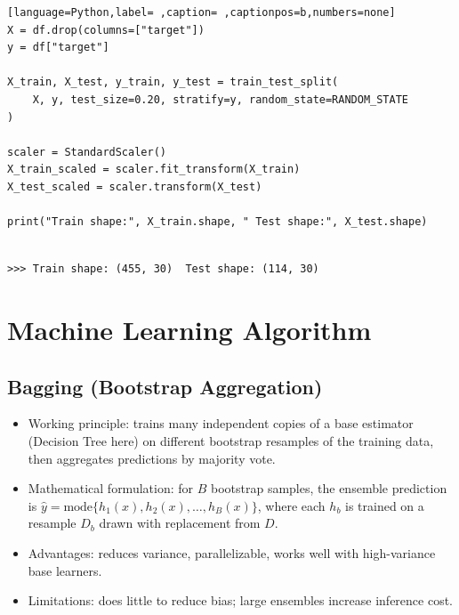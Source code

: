 \documentclass[12pt,a4paper]{article}
\begin{document}
\begin{lstlisting}[language=Python,label= ,caption= ,captionpos=b,numbers=none]
X = df.drop(columns=["target"])
y = df["target"]

X_train, X_test, y_train, y_test = train_test_split(
    X, y, test_size=0.20, stratify=y, random_state=RANDOM_STATE
)

scaler = StandardScaler()
X_train_scaled = scaler.fit_transform(X_train)
X_test_scaled = scaler.transform(X_test)

print("Train shape:", X_train.shape, " Test shape:", X_test.shape)
\end{lstlisting}

\begin{verbatim}

>>> Train shape: (455, 30)  Test shape: (114, 30)
\end{verbatim}

\section{Machine Learning Algorithm}
\label{sec:orgbdd13a5}

\subsection{Bagging (Bootstrap Aggregation)}
\label{sec:orgd33396a}
\begin{itemize}
\item Working principle: trains many independent copies of a base estimator (Decision Tree here) on
different bootstrap resamples of the training data, then aggregates predictions by majority vote.
\item Mathematical formulation: for \(B\) bootstrap samples, the ensemble prediction is
\(\hat{y} = \text{mode}\{h_1(x), h_2(x), \ldots, h_B(x)\}\), where each \(h_b\) is trained on a
resample \(D_b\) drawn with replacement from \(D\).
\item Advantages: reduces variance, parallelizable, works well with high-variance base learners.
\item Limitations: does little to reduce bias; large ensembles increase inference cost.
\end{itemize}
\end{document}
